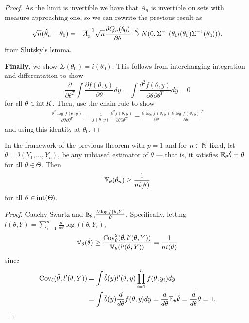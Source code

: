 \begin{proof}
  As the limit is invertible we have that $\overline A_{n}$ is
  invertible on sets with measure approaching one, so we can rewrite
  the previous result as
  \begin{align}
    \label{eq:53}
    \sqrt{n}(\hat \theta_{n} - \theta_{0}) = -\overline A_{n}^{-1}
    \sqrt{n} \frac{\partial Q_{n}(\theta_{0})}{\partial \theta} \overset{d}{\rightarrow}
    N(0, \Sigma^{-1}(\theta_{0} i(\theta_{0}) \Sigma^{-1}(\theta_{0}))).
  \end{align} from Slutsky's lemma.

  \textbf{Finally}, we show $\Sigma(\theta_{0}) = i(\theta_{0})$.
  This follows from interchanging integration and differentation to show
  \begin{equation}
    \label{eq:54}
    \frac{\partial}{\partial \theta^{T}} \int \frac{\partial f(\theta,
      y)}{\partial \theta} dy = \int \frac{\partial^{2} f(\theta,
      y)}{\partial \theta \partial \theta^{T}} dy = 0
  \end{equation} for all $\theta \in \operatorname*{int} K$. Then, use the chain
  rule to show
  \begin{align}
    \label{eq:55}
    \frac{\partial^{2} \log f(\theta, y)}{\partial \theta \partial
      \theta^{T}}  = \frac{1}{f(\theta, y)} \frac{\partial^{2}
      f(\theta, y)}{\partial \theta \partial \theta^{T}}   -
    \frac{\partial \log f(\theta, y)}{\partial \theta}  \frac{\partial
    \log f(\theta, y)}{\partial \theta}^{T}
  \end{align} and using this identity at $\theta_{0}$.
\end{proof}

\begin{thm}
  In the framework of the previous theorem with $p=1$ and for $n \in
  \mathbb{N}$ fixed, let $\tilde \theta = \tilde \theta(Y_{1}, \dots, Y_{n})$,
  be any unbiased estimator of $\theta$ --- that is, it satisfies
  $\E_{\theta} \tilde \theta = \theta$ for all $\theta \in \Theta$.
  Then
  \begin{align}
    \label{eq:17}
    \Var_{\theta}(\tilde \theta_{n}) \geq \frac{1}{ni(\theta)}
  \end{align} for all $\theta \in \operatorname*{int}(\Theta)$.
\end{thm}

\begin{proof}
  Cauchy-Swartz and $\E_{\theta_{0}}\frac{\partial \log f(\theta,
    Y)}{\theta}$.
  Specifically, letting $l(\theta, Y) = \sum_{i=1}^{n}
  \frac{d}{d\theta} \log f(\theta, Y_{i})$,
  \begin{align}
    \label{eq:56}
    \Var_{\theta}(\tilde \theta) \geq \frac{\Cov_{\theta}^{2}(\tilde
      \theta, l'(\theta, Y))}{\Var_{\theta}(l'(\theta, Y))} =
    \frac{1}{ni(\theta)}
  \end{align} since
  \begin{align}
    \label{eq:57}
    \Cov_{\theta}(\tilde \theta, l'(\theta, Y)) &= \int \tilde
    \theta(y) l'(\theta, y) \prod_{i=1}^{n} f(\theta, y_{i}) dy \\
    &= \int \tilde \theta(y) \frac{d}{d\theta}  f(\theta, y) dy =
    \frac{d}{d\theta}  \E_{\theta} \tilde \theta = \frac{d}{d \theta}
    \theta = 1.
  \end{align}
\end{proof}

